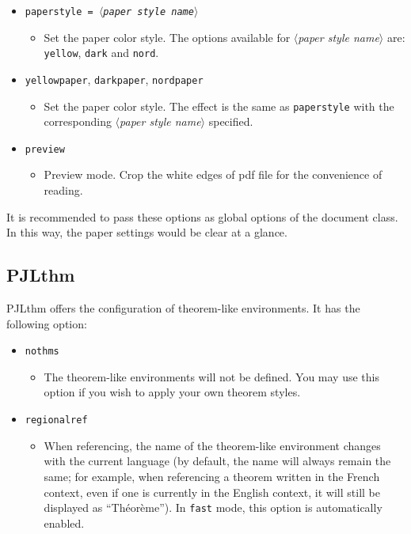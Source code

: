 \documentclass[allowbf]{lebhart}
\providecommand{\meta}[1]{$\langle${\normalfont\itshape#1}$\rangle$}
\providecommand{\PJLthm}{\textsf{PJLthm}}
\begin{document}
\begin{itemize}
    \item \texttt{paperstyle = \meta{paper style name}}
        \begin{itemize}
            \item Set the paper color style. The options available for \meta{paper style name} are: \texttt{yellow}, \texttt{dark} and \texttt{nord}.
        \end{itemize}
    \item \texttt{yellowpaper}, \texttt{darkpaper}, \texttt{nordpaper}
        \begin{itemize}
            \item Set the paper color style. The effect is the same as \texttt{paperstyle} with the corresponding \meta{paper style name} specified.
        \end{itemize}
    \item \texttt{preview}
        \begin{itemize}
            \item Preview mode. Crop the white edges of pdf file for the convenience of reading.
        \end{itemize}
\end{itemize}

It is recommended to pass these options as global options of the document class. In this way, the paper settings would be clear at a glance.

\subsection{PJLthm}

\PJLthm{} offers the configuration of theorem-like environments. It has the following option:

\begin{itemize}
    \item \texttt{nothms}
    \begin{itemize}
        \item The theorem-like environments will not be defined. You may use this option if you wish to apply your own theorem styles.
    \end{itemize}
    \item \texttt{regionalref}
    \begin{itemize}
        \item When referencing, the name of the theorem-like environment changes with the current language (by default, the name will always remain the same; for example, when referencing a theorem written in the French context, even if one is currently in the English context, it will still be displayed as ``Théorème''). In \texttt{fast} mode, this option is automatically enabled.
    \end{itemize}
\end{itemize}
\end{document}
